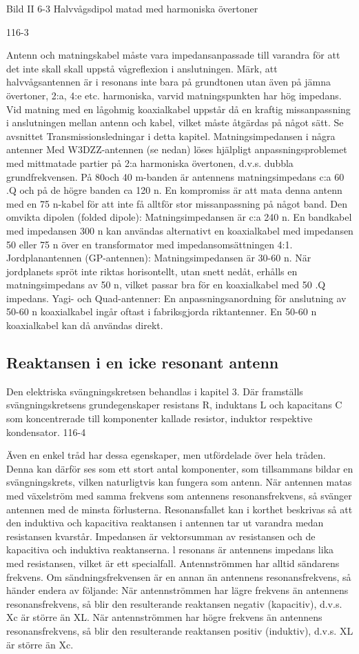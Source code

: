 Bild II 6-3 Halvvågsdipol matad med harmoniska övertoner

116-3

Antenn och matningskabel måste vara
impedansanpassade till varandra för att det
inte skall skall uppstå vågreflexion i anslutningen.
Märk, att halvvågsantennen är i resonans inte bara på grundtonen utan även på
jämna övertoner, 2:a, 4:e etc. harmoniska,
varvid matningspunkten har hög impedans.
Vid matning med en lågohmig koaxialkabel
uppstår då en kraftig missanpassning i anslutningen mellan antenn och kabel, vilket
måste åtgärdas på något sätt. Se avsnittet
Transmissionsledningar i detta kapitel.
Matningsimpedansen i några antenner
Med W3DZZ-antennen (se nedan) löses
hjälpligt anpassningsproblemet med mittmatade partier på 2:a harmoniska övertonen, d.v.s. dubbla grundfrekvensen. På 80och 40 m-banden är antennens matningsimpedans c:a 60 .Q och på de högre banden
ca 120 n. En kompromiss är att mata denna
antenn med en 75 n-kabel för att inte få
alltför stor missanpassning på något band.
Den omvikta dipolen (folded dipole):
Matningsimpedansen är c:a 240 n. En
bandkabel med impedansen 300 n kan användas alternativt en koaxialkabel med
impedansen 50 eller 75 n över en transformator med impedansomsättningen 4:1.
Jordplanantennen (GP-antennen):
Matningsimpedansen är 30-60 n. När
jordplanets spröt inte riktas horisontellt, utan
snett nedåt, erhålls en matningsimpedans
av 50 n, vilket passar bra för en koaxialkabel med 50 .Q impedans.
Yagi- och Quad-antenner:
En anpassningsanordning för anslutning
av 50-60 n koaxialkabel ingår oftast i fabriksgjorda riktantenner. En 50-60 n koaxialkabel kan då användas direkt.

\subsection{Reaktansen i en icke resonant antenn}

Den elektriska svängningskretsen behandlas i kapitel 3. Där framställs svängningskretsens grundegenskaper resistans R, induktans L och kapacitans C som koncentrerade till komponenter kallade resistor, induktor respektive kondensator.
116-4

Även en enkel tråd har dessa egenskaper, men utfördelade över hela tråden. Denna
kan därför ses som ett stort antal komponenter, som tillsammans bildar en svängningskrets, vilken naturligtvis kan fungera som
antenn.
När antennen matas med växelström
med samma frekvens som antennens resonansfrekvens, så svänger antennen med de
minsta förlusterna. Resonansfallet kan i
korthet beskrivas så att den induktiva och
kapacitiva reaktansen i antennen tar ut varandra medan resistansen kvarstår.
Impedansen är vektorsumman av resistansen och de kapacitiva och induktiva reaktanserna. l resonans är antennens impedans lika med resistansen, vilket är ett
specialfall. Antennströmmen har alltid sändarens frekvens. Om sändningsfrekvensen
är en annan än antennens resonansfrekvens, så händer endera av följande:
När antennströmmen har lägre frekvens
än antennens resonansfrekvens, så blir den
resulterande reaktansen negativ (kapacitiv),
d.v.s. Xc är större än XL.
När antennströmmen har högre frekvens
än antennens resonansfrekvens, så blir den
resulterande reaktansen positiv (induktiv),
d.v.s. XL är större än Xc.

